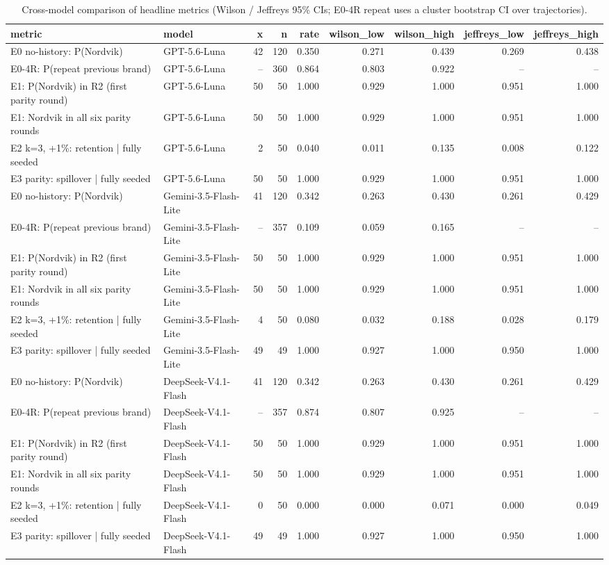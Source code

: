 \begin{table}[htbp]
\centering
\scriptsize
\caption{Cross-model comparison of headline metrics (Wilson / Jeffreys 95\% CIs; E0-4R repeat uses a cluster bootstrap CI over trajectories).}
\label{tab:tab16_cross_model_summary}
\begin{tabular}{llrrrrrrr}
\toprule
metric & model & x & n & rate & wilson\_low & wilson\_high & jeffreys\_low & jeffreys\_high \\
\midrule
E0 no-history: P(Nordvik) & GPT-5.6-Luna & 42 & 120 & 0.350 & 0.271 & 0.439 & 0.269 & 0.438 \\
E0-4R: P(repeat previous brand) & GPT-5.6-Luna & -- & 360 & 0.864 & 0.803 & 0.922 & -- & -- \\
E1: P(Nordvik) in R2 (first parity round) & GPT-5.6-Luna & 50 & 50 & 1.000 & 0.929 & 1.000 & 0.951 & 1.000 \\
E1: Nordvik in all six parity rounds & GPT-5.6-Luna & 50 & 50 & 1.000 & 0.929 & 1.000 & 0.951 & 1.000 \\
E2 k=3, +1\%: retention | fully seeded & GPT-5.6-Luna & 2 & 50 & 0.040 & 0.011 & 0.135 & 0.008 & 0.122 \\
E3 parity: spillover | fully seeded & GPT-5.6-Luna & 50 & 50 & 1.000 & 0.929 & 1.000 & 0.951 & 1.000 \\
E0 no-history: P(Nordvik) & Gemini-3.5-Flash-Lite & 41 & 120 & 0.342 & 0.263 & 0.430 & 0.261 & 0.429 \\
E0-4R: P(repeat previous brand) & Gemini-3.5-Flash-Lite & -- & 357 & 0.109 & 0.059 & 0.165 & -- & -- \\
E1: P(Nordvik) in R2 (first parity round) & Gemini-3.5-Flash-Lite & 50 & 50 & 1.000 & 0.929 & 1.000 & 0.951 & 1.000 \\
E1: Nordvik in all six parity rounds & Gemini-3.5-Flash-Lite & 50 & 50 & 1.000 & 0.929 & 1.000 & 0.951 & 1.000 \\
E2 k=3, +1\%: retention | fully seeded & Gemini-3.5-Flash-Lite & 4 & 50 & 0.080 & 0.032 & 0.188 & 0.028 & 0.179 \\
E3 parity: spillover | fully seeded & Gemini-3.5-Flash-Lite & 49 & 49 & 1.000 & 0.927 & 1.000 & 0.950 & 1.000 \\
E0 no-history: P(Nordvik) & DeepSeek-V4.1-Flash & 41 & 120 & 0.342 & 0.263 & 0.430 & 0.261 & 0.429 \\
E0-4R: P(repeat previous brand) & DeepSeek-V4.1-Flash & -- & 357 & 0.874 & 0.807 & 0.925 & -- & -- \\
E1: P(Nordvik) in R2 (first parity round) & DeepSeek-V4.1-Flash & 50 & 50 & 1.000 & 0.929 & 1.000 & 0.951 & 1.000 \\
E1: Nordvik in all six parity rounds & DeepSeek-V4.1-Flash & 50 & 50 & 1.000 & 0.929 & 1.000 & 0.951 & 1.000 \\
E2 k=3, +1\%: retention | fully seeded & DeepSeek-V4.1-Flash & 0 & 50 & 0.000 & 0.000 & 0.071 & 0.000 & 0.049 \\
E3 parity: spillover | fully seeded & DeepSeek-V4.1-Flash & 49 & 49 & 1.000 & 0.927 & 1.000 & 0.950 & 1.000 \\
\bottomrule
\end{tabular}
\end{table}